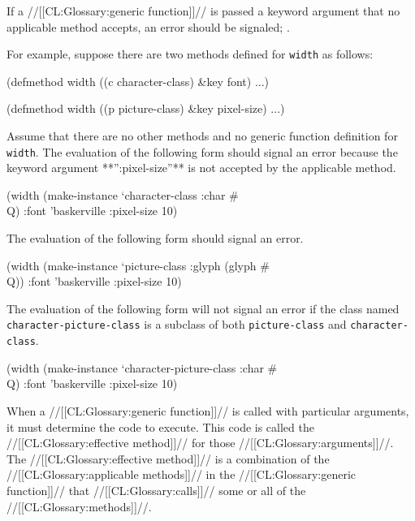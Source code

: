 If a //[[CL:Glossary:generic function]]// is passed a keyword argument that no applicable method accepts, an error should be signaled; \seesection\FuncallErrorChecking.


For example, suppose there are two methods defined for {\tt width} as follows:

\code
 (defmethod width ((c character-class) &key font) ...)
 
 (defmethod width ((p picture-class) &key pixel-size) ...) \endcode

\noindent Assume that there are no other methods and no generic function definition for {\tt width}. The evaluation of the following form should signal an error because  the keyword argument **'':pixel-size''** is not accepted by the applicable method.

\code
 (width (make-instance `character-class :char #\\Q) 
        :font 'baskerville :pixel-size 10) \endcode

The evaluation of the following form should signal an error.

\code
 (width (make-instance `picture-class :glyph (glyph #\\Q)) 
        :font 'baskerville :pixel-size 10) \endcode

The evaluation of the following form will not signal an error if the class named {\tt character-picture-class} is a subclass of both {\tt picture-class} and {\tt character-class}.

\code
 (width (make-instance `character-picture-class :char #\\Q)
        :font 'baskerville :pixel-size 10) \endcode

\endsubsubsection%

\endSubsection%

 

When a //[[CL:Glossary:generic function]]// is called with particular arguments, it must determine the code to execute.  This code is called the  //[[CL:Glossary:effective method]]// for those //[[CL:Glossary:arguments]]//. The //[[CL:Glossary:effective method]]// is a  combination of the //[[CL:Glossary:applicable methods]]// in the //[[CL:Glossary:generic function]]// that //[[CL:Glossary:calls]]// some or all of the //[[CL:Glossary:methods]]//.

